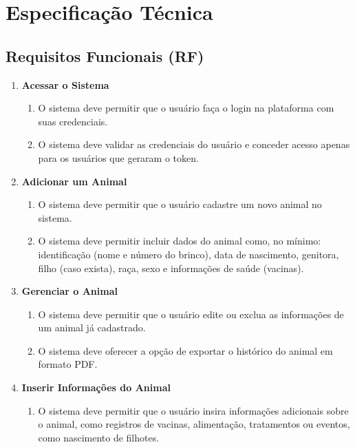 \documentclass[12pt, a4paper]{article}
\begin{document}
\section{Especificação Técnica}

\subsection{Requisitos Funcionais (RF)}
\begin{spacing}{1.5}
\begin{enumerate}[label=RF0\arabic{*}.]
    \item \textbf{Acessar o Sistema}
    \begin{enumerate}[label=RF01.0\arabic{*}]
        \item O sistema deve permitir que o usuário faça o login na plataforma com suas credenciais.
        \item O sistema deve validar as credenciais do usuário e conceder acesso apenas para os usuários que geraram o token.
    \end{enumerate}
    \item \textbf{Adicionar um Animal}
    \begin{enumerate}[label=RF02.0\arabic{*}]
        \item O sistema deve permitir que o usuário cadastre um novo animal no sistema.
        \item O sistema deve permitir incluir dados do animal como, no mínimo: identificação (nome e número do brinco), data de nascimento, genitora, filho (caso exista), raça, sexo e informações de saúde (vacinas).
    \end{enumerate}
    \item \textbf{Gerenciar o Animal}
    \begin{enumerate}[label=RF03.0\arabic{*}]
        \item O sistema deve permitir que o usuário edite ou exclua as informações de um animal já cadastrado.
        \item O sistema deve oferecer a opção de exportar o histórico do animal em formato PDF.
    \end{enumerate}
    \item \textbf{Inserir Informações do Animal}
    \begin{enumerate}[label=RF04.0\arabic{*}]
        \item O sistema deve permitir que o usuário insira informações adicionais sobre o animal, como registros de vacinas, alimentação, tratamentos ou eventos, como nascimento de filhotes.

\end{enumerate}
\end{enumerate}
\end{spacing}
\end{document}
